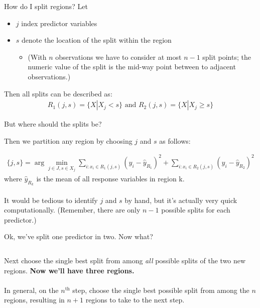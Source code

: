 \documentclass[mathserif, aspectratio=169]{beamer}
\begin{document}
\begin{frame}{How do I split regions?}
Let 
\begin{itemize}
\item $j$ index predictor variables
\item $s$ denote the location of the split within the region
\begin{itemize}
\item (With $n$ observations we have to consider at most $n-1$ split points; the numeric value of the split is the mid-way point between to adjacent observations.)
\end{itemize}
\end{itemize}

\vspace{5mm}

Then all splits can be described as:
\begin{align*}
R_1(j,s) = \{X|X_j<s\} \text{ and } R_2(j,s) = \{X|X_j\ge s\} 
\end{align*}
\end{frame}

\begin{frame}{But where should the splits be?}

Then we partition any region by choosing $j$ and $s$ as follows:

\begin{align*}
\{j,s\} = \arg \min_{j\in J, s\in X_j} \sum_{i:x_i\in R_1(j,s)} (y_i-\hat{y}_{R_1})^2 + \sum_{i:x_i\in R_2(j,s)} (y_i-\hat{y}_{R_2})^2
\end{align*}
where $\hat{y}_{R_k}$ is the mean of all response variables in region k.  \\~\\

It would be tedious to identify $j$ and $s$ by hand, but it's actually very quick computationally.  (Remember, there are only $n-1$ possible splits for each predictor.)
\end{frame}

\begin{frame}{Ok, we've split one predictor in two.  Now what?}

\begin{columns}
Next choose the single best split from among \textit{all} possible splits of the two new regions. \textbf{Now we'll have three regions.}\\~\\

In general, on the $n^\text{th}$ step, choose the single best possible split from among the $n$ regions, resulting in $n+1$ regions to take to the next step. 


\end{columns}

\end{frame}
\end{document}
